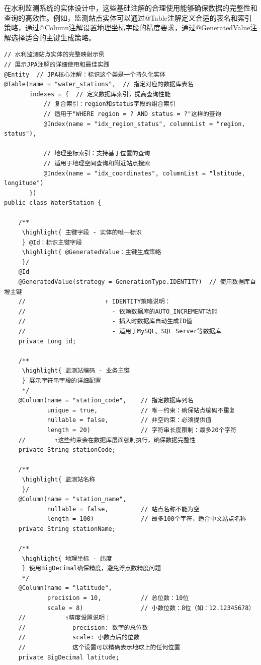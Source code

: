 在水利监测系统的实体设计中，这些基础注解的合理使用能够确保数据的完整性和查询的高效性。例如，监测站点实体可以通过@Table注解定义合适的表名和索引策略，通过@Column注解设置地理坐标字段的精度要求，通过@GeneratedValue注解选择适合的主键生成策略。

\begin{lstlisting}[style=java]
// 水利监测站点实体的完整映射示例
// 展示JPA注解的详细使用和最佳实践
@Entity  // JPA核心注解：标识这个类是一个持久化实体
@Table(name = "water_stations",  // 指定对应的数据库表名
       indexes = {  // 定义数据库索引，提高查询性能
           // 复合索引：region和status字段的组合索引
           // 适用于"WHERE region = ? AND status = ?"这样的查询
           @Index(name = "idx_region_status", columnList = "region, status"),
           
           // 地理坐标索引：支持基于位置的查询
           // 适用于地理空间查询和附近站点搜索
           @Index(name = "idx_coordinates", columnList = "latitude, longitude")
       })
public class WaterStation {
    
    /**
     \highlight{ 主键字段 - 实体的唯一标识
     } @Id：标识主键字段
     \highlight{ @GeneratedValue：主键生成策略
     }/
    @Id
    @GeneratedValue(strategy = GenerationType.IDENTITY)  // 使用数据库自增主键
    //                      ↑ IDENTITY策略说明：
    //                        - 依赖数据库的AUTO_INCREMENT功能
    //                        - 插入时数据库自动生成ID值
    //                        - 适用于MySQL、SQL Server等数据库
    private Long id;
    
    /**
     \highlight{ 监测站编码 - 业务主键
     } 展示字符串字段的详细配置
     */
    @Column(name = "station_code",    // 指定数据库列名
            unique = true,            // 唯一约束：确保站点编码不重复
            nullable = false,         // 非空约束：必须提供值
            length = 20)              // 字符串长度限制：最多20个字符
    //        ↑这些约束会在数据库层面强制执行，确保数据完整性
    private String stationCode;
    
    /**
     \highlight{ 监测站名称
     }/
    @Column(name = "station_name", 
            nullable = false,         // 站点名称不能为空
            length = 100)             // 最多100个字符，适合中文站点名称
    private String stationName;
    
    /**
     \highlight{ 地理坐标 - 纬度
     } 使用BigDecimal确保精度，避免浮点数精度问题
     */
    @Column(name = "latitude", 
            precision = 10,           // 总位数：10位
            scale = 8)                // 小数位数：8位（如：12.12345678）
    //           ↑精度设置说明：
    //             precision: 数字的总位数
    //             scale: 小数点后的位数
    //             这个设置可以精确表示地球上的任何位置
    private BigDecimal latitude;
    

\end{lstlisting}
